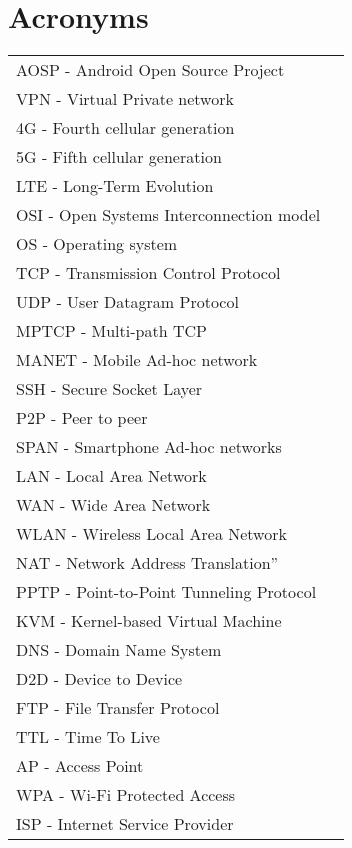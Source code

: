 \chapter*{Acronyms}
\begin{tabular}{ll}
AOSP - Android Open Source Project\\
VPN - Virtual Private network\\
4G - Fourth cellular generation \\
5G - Fifth cellular generation \\
LTE -  Long-Term Evolution\\
OSI - Open Systems Interconnection model\\
OS - Operating system\\
TCP - Transmission Control Protocol\\
UDP - User Datagram Protocol\\
MPTCP - Multi-path TCP\\
MANET - Mobile Ad-hoc network\\
SSH - Secure Socket Layer\\
P2P - Peer to peer\\
SPAN - Smartphone Ad-hoc networks \\
LAN - Local Area Network\\
WAN - Wide Area Network\\
WLAN - Wireless Local Area Network\\
NAT - Network Address Translation”\\
PPTP - Point-to-Point Tunneling Protocol\\
KVM - Kernel-based Virtual Machine\\
DNS - Domain Name System\\
D2D - Device to Device\\
FTP - File Transfer Protocol\\
TTL - Time To Live\\
AP - Access Point\\
WPA - Wi-Fi Protected Access\\
ISP - Internet Service Provider\\



\end{tabular}
